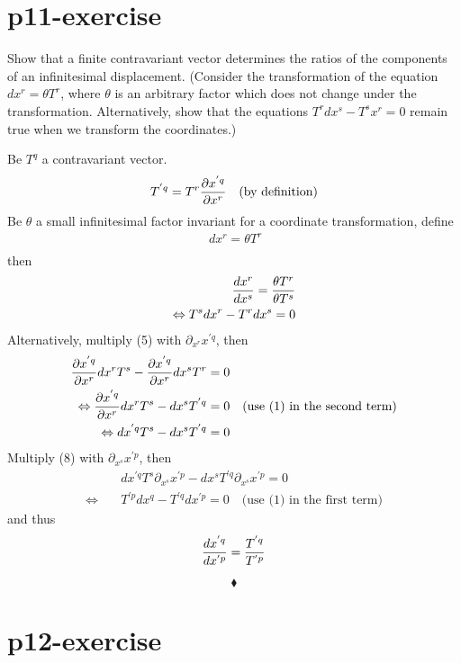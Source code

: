 \section{p11-exercise}

\begin{tcolorbox}
Show that a finite contravariant vector determines the ratios of the components of an infinitesimal displacement. (Consider the transformation of the equation $dx^r=\theta T^r$, where $\theta$ is an arbitrary factor which does not change under the transformation. Alternatively, show that the equations $T^{r} dx^{s}-T^{s} x^{r} = 0$ remain true when we transform the coordinates.)

\end{tcolorbox}
Be $T^{q}$ a contravariant vector.
\begin{align}
T^{'q}=T^{r} \pdv{x^{'q}}{x^r}\quad\text{(by definition)}
\end{align}
Be  $\theta$ a small infinitesimal factor invariant for a coordinate transformation,  define \\
\begin{align}
\ dx^{r} = \theta T^{r} \\
\end{align}
then
\begin{align}
\dv{x^r}{x^s} = \frac{\theta T^r}{\theta T^s}\\
\Leftrightarrow T^s dx^r - T^r dx^s = 0
\end{align}
Alternatively, multiply (5) with $\partial_{x^r}{x^{'q}}$, then
\begin{align}
\pdv{x^{'q}}{x^r} dx^r T^s   -  \pdv{x^{'q}}{x^r}dx^s T^r &= 0\\
\Leftrightarrow \pdv{x^{'q}}{x^r} dx^r T^s   -  dx^s T^{'q} &= 0 \quad \text{(use (1) in the second term)}\\
\Leftrightarrow dx^{'q} T^s   -  dx^s T^{'q} &= 0 \\
\end{align}
Multiply (8) with $\partial_{x^s}{x^{'p}}$, then
\begin{align}
\ &dx^{'q} T^s \partial_{x^s}{x^{'p}}  -  dx^s T^{'q}\partial_{x^s}{x^{'p}} = 0 \\
\Leftrightarrow \quad &T^{'p} dx^q   -   T^{'q} dx^{'p} = 0 \quad \text{(use (1) in the first term)}
\end{align}
and thus 
$$\dv{x^{'q}}{x^{'p}} = \frac{T^{'q}}{T^{'p}}$$

$$\blacklozenge$$
\pagebreak[4]


\section{p12-exercise}

